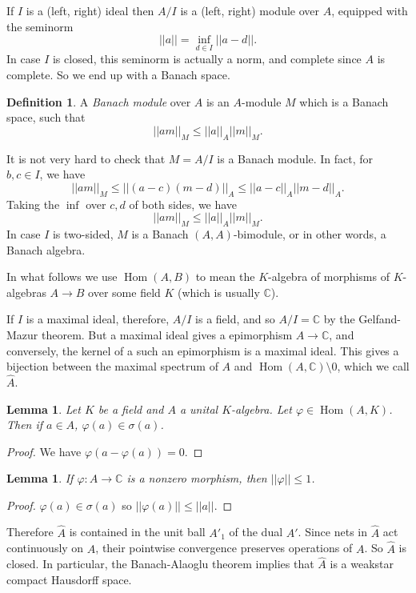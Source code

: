 \documentclass[12pt]{report}
\newcommand{\CC}{\mathbb{C}}
\newcommand{\Hom}{\operatorname{Hom}}
\newcommand{\dfn}[1]{\emph{#1}\index{#1}}
\newtheorem{lemma}[theorem]{Lemma}
\theoremstyle{definition}
\newtheorem{definition}[theorem]{Definition}
\begin{document}
If $I$ is a (left, right) ideal then $A/I$ is a (left, right) module over $A$, equipped with the seminorm
$$||a|| = \inf_{d \in I} ||a - d||.$$
In case $I$ is closed, this seminorm is actually a norm, and complete since $A$ is complete. So we end up with a Banach space.

\begin{definition}
    A \dfn{Banach module} over $A$ is an $A$-module $M$ which is a Banach space, such that
    $$||am||_M \leq ||a||_A ||m||_M.$$
\end{definition}
It is not very hard to check that $M = A/I$ is a Banach module. In fact, for $b, c \in I$, we have
$$||am||_M \leq ||(a - c)(m - d)||_A \leq ||a - c||_A ||m - d||_A.$$
Taking the $\inf$ over $c, d$ of both sides, we have
$$||am||_M \leq ||a||_A ||m||_M.$$
In case $I$ is two-sided, $M$ is a Banach $(A, A)$-bimodule, or in other words, a Banach algebra.

In what follows we use $\Hom(A, B)$ to mean the $K$-algebra of morphisms of $K$-algebras $A \to B$ over some field $K$ (which is usually $\CC$).

If $I$ is a maximal ideal, therefore, $A/I$ is a field, and so $A/I = \CC$ by the Gelfand-Mazur theorem. But a maximal ideal gives a epimorphism $A \to \CC$, and conversely, the kernel of a such an epimorphism is a maximal ideal. This gives a bijection between the maximal spectrum of $A$ and $\Hom(A, \CC) \setminus 0$, which we call $\hat A$.

\begin{lemma}
    Let $K$ be a field and $A$ a unital $K$-algebra. Let $\varphi \in \Hom(A, K)$. Then if $a \in A$, $\varphi(a) \in \sigma(a)$.
\end{lemma}
\begin{proof}
    We have $\varphi(a - \varphi(a)) = 0$.
\end{proof}
\begin{lemma}
    If $\varphi: A \to \CC$ is a nonzero morphism, then $||\varphi|| \leq 1$.
\end{lemma}
\begin{proof}
    $\varphi(a) \in \sigma(a)$ so $||\varphi(a)|| \leq ||a||$.
\end{proof}

Therefore $\hat A$ is contained in the unit ball $A'_1$ of the dual $A'$. Since nets in $\hat A$ act continuously on $A$, their pointwise convergence preserves operations of $A$. So $\hat A$ is closed. In particular, the Banach-Alaoglu theorem implies that $\hat A$ is a weakstar compact Hausdorff space.
\end{document}
